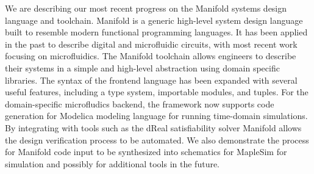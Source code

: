 We are describing our most recent progress on the Manifold systems design language and toolchain.
Manifold is a generic high-level system design language built to resemble modern functional programming languages.
It has been applied in the past to describe digital and microfluidic circuits, with most recent work focusing on microfluidics.
The Manifold toolchain allows engineers to describe their systems in a simple and high-level abstraction using domain specific libraries.
The syntax of the frontend language has been expanded with several useful features, including a type system, importable modules, and tuples.
For the domain-specific microfludics backend, the framework now supports code generation for Modelica modeling language for running time-domain simulations.
By integrating with tools such as the dReal satisfiability solver Manifold allows the design verification process to be automated.
We also demonstrate the process for Manifold code input to be synthesized into schematics for MapleSim for simulation and possibly for additional tools in the future.